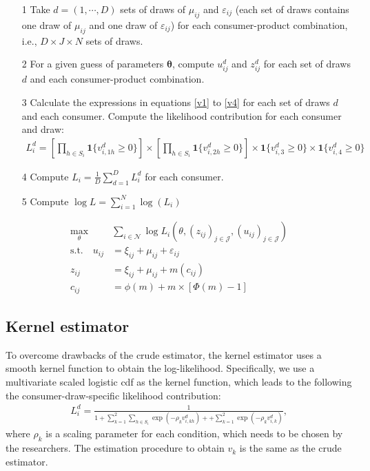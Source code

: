 \documentclass[12pt]{article}
\renewcommand*{\epsilon}{\varepsilon}
\begin{document}
\begin{itemize}
    \item[1] Take $d = (1, \cdots, D)$ sets of draws of $\mu_{ij}$ and $\epsilon_{ij}$ (each set of draws contains one draw of $\mu_{ij}$ and one draw of $\epsilon_{ij}$) for each consumer-product combination, i.e., $D\times J \times N$ sets of draws.
    \item[2] For a given guess of parameters $\bm{\theta}$, compute $u^d_{ij}$ and $z^d_{ij}$ for each set of draws $d$ and each consumer-product combination.
    \item[3] Calculate the expressions in equations \eqref{v1} to \eqref{v4} for each set of draws $d$ and each consumer. Compute the likelihood contribution for each consumer and draw:
    \begin{align*}
        L_i^d = \left[\prod_{h \in S_i} \bm{1}\{v^d_{i,1h} \geq 0\} \right] \times \left[\prod_{h \in S_i} \bm{1}\{v^d_{i,2h} \geq 0\} \right] \times  \bm{1}\{v^d_{i,3} \geq 0\}  \times  \bm{1}\{v^d_{i,4} \geq 0\}
    \end{align*}
    \item[4] Compute $L_i = \frac{1}{D}\sum_{d = 1}^D L_i^d$ for each consumer.
    \item[5] Compute $\log L = \sum_{i = 1}^N \log(L_i)$
\end{itemize}

\begin{align*}
    \max_{\theta}& \sum_{i\in \mathcal{N}} \log L_{i}(\theta,(z_{ij})_{j\in \mathcal{J}},(u_{ij})_{j\in \mathcal{J}})\nonumber\\
    \text{s.t.}\quad u_{i j} & =\xi_{i j}+\mu_{i j}+\varepsilon_{i j}\label{eq:mpec_formula}\\
    z_{i j}&=\xi_{i j}+\mu_{i j}+m\left(c_{i j}\right) \nonumber\\
    c_{i j}&=\phi(m)+m \times[\Phi(m)-1] \nonumber
\end{align*}

\subsection{Kernel estimator}
To overcome drawbacks of the crude estimator, the kernel estimator uses a smooth kernel function to obtain the log-likelihood. Specifically, we use a multivariate scaled logistic cdf as the kernel function, which leads to the following the consumer-draw-specific likelihood contribution:
\begin{align*}
    L_i^d = \frac{1}{1 + \sum_{k=1}^2 \sum_{h \in S_i} \exp (- \rho_k v^d_{i,kh}) +  + \sum_{k=1}^2 \exp (- \rho_k v^d_{i,k})},
\end{align*}
where $\rho_k$ is a scaling parameter for each condition, which needs to be chosen by the researchers. The estimation procedure to obtain $v_k$ is the same as the crude estimator.
\end{document}
